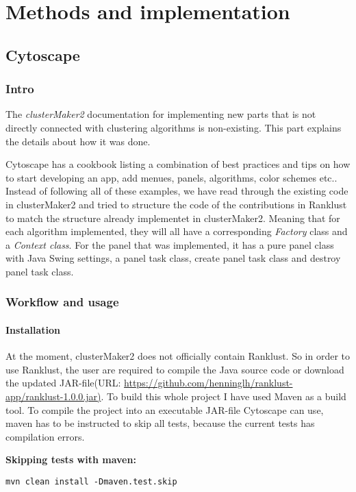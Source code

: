 \part{Methods and implementation}
\label{pa:methods}
\chapter{Cytoscape}
\section{Intro}
The \textit{clusterMaker2} documentation for implementing new parts that is not
directly connected with clustering algorithms is non-existing. This part
explains the details about how it was done.

Cytoscape has a cookbook\cite{cytoscape-cookbook} listing a combination of best
practices and tips on how to start developing an app, add menues, panels,
algorithms, color schemes etc.. Instead of following all of these examples, we
have read through the existing code in clusterMaker2\cite{cm2-github} and tried
to structure the code of the contributions in Ranklust to match the structure
already implementet in clusterMaker2. Meaning that for each algorithm
implemented, they will all have a corresponding \textit{Factory} class and a
\textit{Context class}. For the panel that was implemented, it has a pure panel
class with Java Swing\cite{java-swing} settings, a panel task class, create
panel task class and destroy panel task class.

\section{Workflow and usage}
\subsection{Installation}
At the moment, clusterMaker2 does not officially contain Ranklust. So in order
to use Ranklust, the user are required to compile the Java source code or
download the updated JAR-file\cite{jar}(URL: \url{
https://github.com/henninglh/ranklust-app/ranklust-1.0.0.jar)}. To build this
whole project I have used Maven as a build tool\cite{maven}. To compile the
project into an executable JAR-file Cytoscape can use, \gls{maven} has to be
instructed to skip all tests, because the current tests has compilation errors.

\textbf{Skipping tests with maven:}
\begin{Verbatim}[fontsize=\scriptsize]
mvn clean install -Dmaven.test.skip
\end{Verbatim}


